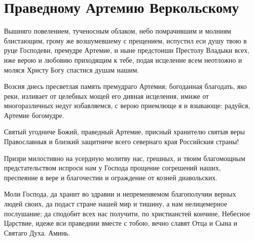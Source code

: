 \section{Праведному Артемию Веркольскому}\begin{mymulticols}


Вышняго повелением, тученосным облаком, небо помрачившим и молниям блистающим, грому же возшумевшему с прещением, испустил еси душу твою в руце Господеви, премудре Артемие, и ныне предстоиши Престолу Владыки всех, иже верою и любовию приходящим к тебе, подая исцеление всем неотложно и моляся Христу Богу спастися душам нашим.


Возсия днесь пресветлая память премудраго Артемия; богоданная благодать, яко реки, изливает от целебных мощей его дивная исцеления, имиже от многоразличных недуг избавляемся, с верою приемлюще я и взывающе: радуйся, Артемие богомудре.


Святый угодниче Божий, праведный Артемие, присный хранителю святыя веры Православныя и близкий защитниче всего севернаго края Российския страны! 

Призри милостивно на усердную молитву нас, грешных, и твоим благомощным предстательством испроси нам у Господа прощение согрешений наших, преспеяние в вере и благочестии и ограждение от козней диавольских. 

Моли Господа, да хранит во здравии и непременяемом благополучии верных людей своих, да подаст стране нашей мир и тишину, а нам нелицемерное послушание; да сподобит всех нас получити, по христианстей кончине, Небесное Царствие, идеже вси праведнии вместе с тобою, вечно славят Отца и Сына и Святаго Духа. Аминь.

\end{mymulticols}

\mychapterending


